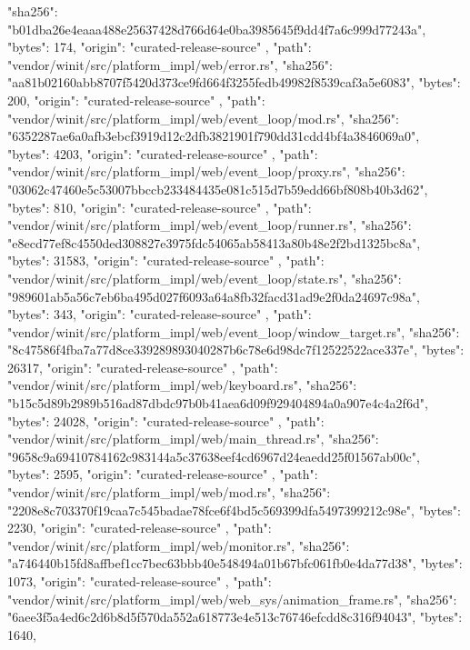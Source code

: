 {{      "sha256": "b01dba26e4eaaa488e25637428d766d64e0ba3985645f9dd4f7a6c999d77243a",
      "bytes": 174,
      "origin": "curated-release-source"
    },
    {
      "path": "vendor/winit/src/platform_impl/web/error.rs",
      "sha256": "aa81b02160abb8707f5420d373ce9fd664f3255fedb49982f8539caf3a5e6083",
      "bytes": 200,
      "origin": "curated-release-source"
    },
    {
      "path": "vendor/winit/src/platform_impl/web/event_loop/mod.rs",
      "sha256": "6352287ae6a0afb3ebcf3919d12c2dfb3821901f790dd31cdd4bf4a3846069a0",
      "bytes": 4203,
      "origin": "curated-release-source"
    },
    {
      "path": "vendor/winit/src/platform_impl/web/event_loop/proxy.rs",
      "sha256": "03062c47460e5c53007bbccb233484435e081c515d7b59edd66bf808b40b3d62",
      "bytes": 810,
      "origin": "curated-release-source"
    },
    {
      "path": "vendor/winit/src/platform_impl/web/event_loop/runner.rs",
      "sha256": "e8ecd77ef8c4550ded308827e3975fdc54065ab58413a80b48e2f2bd1325bc8a",
      "bytes": 31583,
      "origin": "curated-release-source"
    },
    {
      "path": "vendor/winit/src/platform_impl/web/event_loop/state.rs",
      "sha256": "989601ab5a56c7eb6ba495d027f6093a64a8fb32facd31ad9e2f0da24697c98a",
      "bytes": 343,
      "origin": "curated-release-source"
    },
    {
      "path": "vendor/winit/src/platform_impl/web/event_loop/window_target.rs",
      "sha256": "8c47586f4fba7a77d8ce339289893040287b6c78e6d98dc7f12522522ace337e",
      "bytes": 26317,
      "origin": "curated-release-source"
    },
    {
      "path": "vendor/winit/src/platform_impl/web/keyboard.rs",
      "sha256": "b15c5d89b2989b516ad87dbdc97b0b41aea6d09f929404894a0a907e4c4a2f6d",
      "bytes": 24028,
      "origin": "curated-release-source"
    },
    {
      "path": "vendor/winit/src/platform_impl/web/main_thread.rs",
      "sha256": "9658c9a69410784162c983144a5c37638eef4cd6967d24eaedd25f01567ab00c",
      "bytes": 2595,
      "origin": "curated-release-source"
    },
    {
      "path": "vendor/winit/src/platform_impl/web/mod.rs",
      "sha256": "2208e8c703370f19caa7c545badae78fce6f4bd5c569399dfa5497399212c98e",
      "bytes": 2230,
      "origin": "curated-release-source"
    },
    {
      "path": "vendor/winit/src/platform_impl/web/monitor.rs",
      "sha256": "a746440b15fd8affbef1cc7bec63bbb40e548494a01b67bfc061fb0e4da77d38",
      "bytes": 1073,
      "origin": "curated-release-source"
    },
    {
      "path": "vendor/winit/src/platform_impl/web/web_sys/animation_frame.rs",
      "sha256": "6aee3f5a4ed6c2d6b8d5f570da552a618773e4e513c76746efcdd8c316f94043",
      "bytes": 1640,
}}
